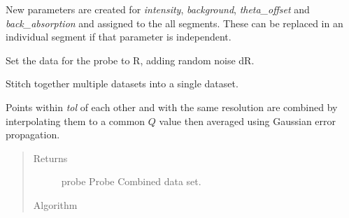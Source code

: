 \documentclass[letterpaper,10pt,english]{sphinxmanual}
\begin{document}
\begin{fulllineitems}
\begin{fulllineitems}
New parameters are created for \emph{intensity}, \emph{background},
\emph{theta\_offset} and \emph{back\_absorption} and assigned to the all
segments.  These can be replaced in an individual segment if
that parameter is independent.

\end{fulllineitems}


\begin{fulllineitems}
\label{api/probe:refl1d.probe.ProbeSet.simulate_data}
Set the data for the probe to R, adding random noise dR.

\end{fulllineitems}


\begin{fulllineitems}
\label{api/probe:refl1d.probe.ProbeSet.stitch}
Stitch together multiple datasets into a single dataset.

Points within \emph{tol} of each other and with the same resolution
are combined by interpolating them to a common $Q$ value then averaged
using Gaussian error propagation.
\begin{quote}\begin{description}
\item[{Returns }] \leavevmode
probe \textbar{} Probe
Combined data set.

\item[{Algorithm }] \leavevmode
\end{description}\end{quote}


\end{fulllineitems}
\end{fulllineitems}
\end{document}
